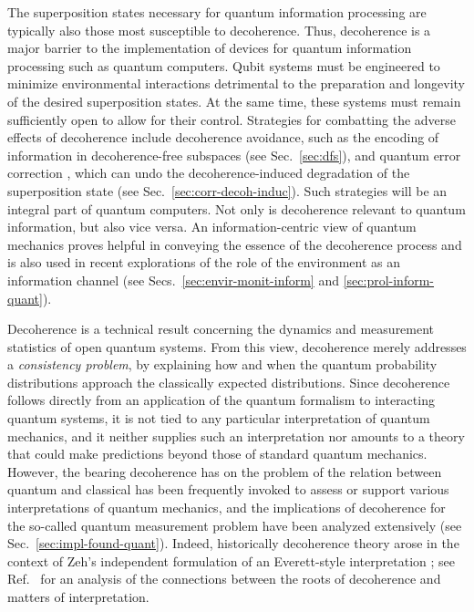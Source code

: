 \documentclass[3p,sort&compress,12pt]{elsarticle}
\begin{document}
The superposition states necessary for quantum information processing are typically also those most susceptible to decoherence. Thus, decoherence is a major barrier to the implementation of devices for quantum information processing such as quantum computers. Qubit systems must be engineered to minimize environmental interactions detrimental to the preparation and longevity of the desired superposition states. At the same time, these systems must remain sufficiently open to allow for their control. Strategies for combatting the adverse effects of decoherence include decoherence avoidance, such as the encoding of information in decoherence-free subspaces (see Sec.~\ref{sec:dfs}), and quantum error correction \cite{Lidar:2013:pp}, which can undo the decoherence-induced degradation of the superposition state (see Sec.~\ref{sec:corr-decoh-induc}). Such strategies will be an integral part of quantum computers. Not only is decoherence relevant to quantum information, but also vice versa. An information-centric view of quantum mechanics proves helpful in conveying the essence of the decoherence process and is also used in recent explorations of the role of the environment as an information channel (see Secs.~\ref{sec:envir-monit-inform} and \ref{sec:prol-inform-quant}).

Decoherence is a technical result concerning the dynamics and measurement statistics of open quantum systems. From this view, decoherence merely addresses a \emph{consistency problem}, by explaining how and when the quantum probability distributions approach the classically expected distributions. Since decoherence follows directly from an application of the quantum formalism to interacting quantum systems, it is not tied to any particular interpretation of quantum mechanics, and it neither supplies such an interpretation nor amounts to a theory that could make predictions beyond those of standard quantum mechanics.  However, the bearing decoherence has on the problem of the relation between quantum and classical has been frequently invoked to assess or support various interpretations of quantum mechanics, and the implications of decoherence for the so-called quantum measurement problem have been analyzed extensively (see Sec.~\ref{sec:impl-found-quant}). Indeed, historically decoherence theory arose in the context of Zeh's independent formulation of an Everett-style interpretation \cite{Zeh:1970:yt}; see Ref.~\cite{Camilleri:2009:aq} for an analysis of the connections between the roots of decoherence and matters of interpretation.
\end{document}
